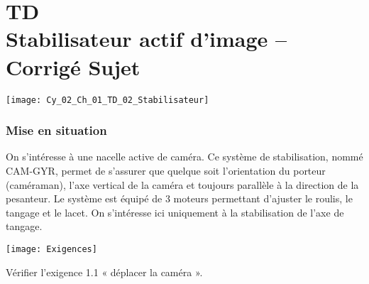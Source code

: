 \chapter*{TD  \\ 
Stabilisateur actif d'image   -- \ifprof Corrigé \else Sujet \fi}

\iflivret {} \else
\ifprof  {} \else \fi
\fi

\setcounter{question}{0}

\begin{marginfigure}
\texttt{[image: Cy\_02\_Ch\_01\_TD\_02\_Stabilisateur]}
\end{marginfigure}

\subsection*{Mise en situation}
\ifprof
\else
On s'intéresse à une nacelle active de caméra. Ce système de stabilisation, nommé CAM-GYR, permet de s'assurer que quelque soit l'orientation du porteur (caméraman), l'axe vertical de la caméra et toujours parallèle à la direction de la pesanteur. 
Le système est équipé de 3 moteurs permettant d'ajuster le roulis, le tangage et le lacet. On s'intéresse ici uniquement à la stabilisation de l'axe de tangage. 

\begin{center}
\texttt{[image: Exigences]}
\end{center}
\fi
\begin{obj}
Vérifier l'exigence 1.1 « déplacer la caméra ». %
\end{obj}



